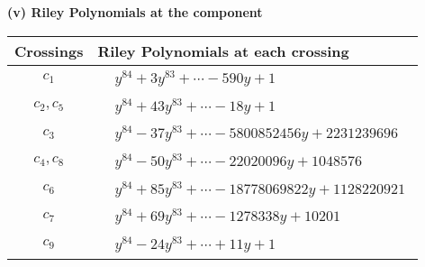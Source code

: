 \documentclass[1p]{elsarticle_modified}
\theoremstyle{definition}
\begin{document}
\newpage\renewcommand{\arraystretch}{1}
\flushleft \textbf{(v) Riley Polynomials at the component}\newline \\
\begin{tabular}{m{50pt}|m{274pt}}
Crossings & \hspace{64pt}Riley Polynomials at each crossing \\
\hline $$\begin{aligned}c_{1}\end{aligned}$$&$\begin{aligned}
&y^{84}+3 y^{83}+\cdots-590 y+1
\end{aligned}$\\
\hline $$\begin{aligned}c_{2},c_{5}\end{aligned}$$&$\begin{aligned}
&y^{84}+43 y^{83}+\cdots-18 y+1
\end{aligned}$\\
\hline $$\begin{aligned}c_{3}\end{aligned}$$&$\begin{aligned}
&y^{84}-37 y^{83}+\cdots-5800852456 y+2231239696
\end{aligned}$\\
\hline $$\begin{aligned}c_{4},c_{8}\end{aligned}$$&$\begin{aligned}
&y^{84}-50 y^{83}+\cdots-22020096 y+1048576
\end{aligned}$\\
\hline $$\begin{aligned}c_{6}\end{aligned}$$&$\begin{aligned}
&y^{84}+85 y^{83}+\cdots-18778069822 y+1128220921
\end{aligned}$\\
\hline $$\begin{aligned}c_{7}\end{aligned}$$&$\begin{aligned}
&y^{84}+69 y^{83}+\cdots-1278338 y+10201
\end{aligned}$\\
\hline $$\begin{aligned}c_{9}\end{aligned}$$&$\begin{aligned}
&y^{84}-24 y^{83}+\cdots+11 y+1
\end{aligned}$\\

\end{tabular}
\end{document}
